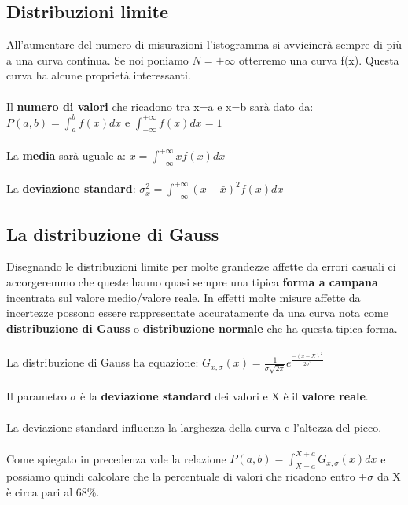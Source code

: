 \documentclass{article}
\begin{document}
\subsection{Distribuzioni limite}
All'aumentare del numero di misurazioni l'istogramma si avvicinerà sempre di più a una curva continua. Se noi poniamo $N=+ \infty$ otterremo una curva f(x). Questa curva ha alcune proprietà interessanti.\\\\
Il \textbf{numero di valori} che ricadono tra x=a e x=b sarà dato da: $P(a, b) = \int_a ^b f(x) dx$ \quad e $\int_{- \infty} ^ {+ \infty} f(x)dx = 1$ \\\\
La \textbf{media} sarà uguale a: $\bar{x} = \int_{- \infty} ^ {+ \infty} x f(x) dx$\\\\
La \textbf{deviazione standard}: $\sigma_x ^2 = \int_{- \infty} ^ {+ \infty} \left( x - \bar{x} \right)^2 f(x)dx$\\

\subsection{La distribuzione di Gauss}
Disegnando le distribuzioni limite per molte grandezze affette da errori casuali ci accorgeremmo che queste hanno quasi sempre una tipica \textbf{forma a campana} incentrata sul valore medio/valore reale. In effetti molte misure affette da incertezze possono essere rappresentate accuratamente da una curva nota come \textbf{distribuzione di Gauss} o \textbf{distribuzione normale} che ha questa tipica forma.\\\\
La distribuzione di Gauss ha equazione:
$G_{x,\sigma}(x) = \frac{1}{\sigma \sqrt{2 \pi}} e^\frac{-(x - X)^2}{2 \sigma ^2}$\\\\
Il parametro $\sigma$ è la \textbf{deviazione standard} dei valori e X è il \textbf{valore reale}.\\\\
La deviazione standard influenza la larghezza della curva e l'altezza del picco.\\\\
Come spiegato in precedenza vale la relazione $P(a, b) = \int _{X - a} ^{X + a} G_{x,\sigma} (x)dx$ e possiamo quindi calcolare che la percentuale di valori che ricadono entro $\pm \sigma$ da X è circa pari al 68\%.
\end{document}
